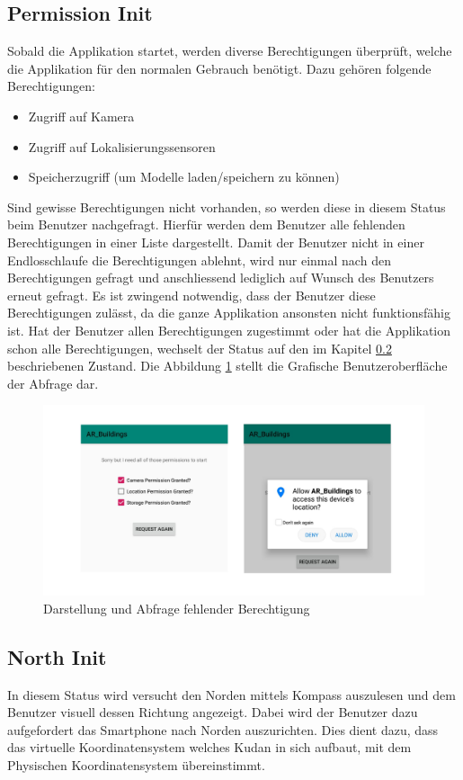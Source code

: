 \documentclass[a4paper]{scrreprt}
\begin{document}
\subsection{Permission Init}
Sobald die Applikation startet, werden diverse Berechtigungen überprüft, welche die Applikation für den normalen Gebrauch benötigt. Dazu gehören folgende Berechtigungen:
\begin{itemize}
\item Zugriff auf Kamera
\item Zugriff auf Lokalisierungssensoren
\item Speicherzugriff (um Modelle laden/speichern zu können)
\end{itemize}
Sind gewisse Berechtigungen nicht vorhanden, so werden diese in diesem Status beim Benutzer nachgefragt. Hierfür werden dem Benutzer alle fehlenden Berechtigungen in einer Liste dargestellt. Damit der Benutzer nicht in einer Endlosschlaufe die Berechtigungen ablehnt, wird nur einmal nach den Berechtigungen gefragt und anschliessend lediglich auf Wunsch des Benutzers erneut gefragt. Es ist zwingend notwendig, dass der Benutzer diese Berechtigungen zulässt, da die ganze Applikation ansonsten nicht funktionsfähig ist. Hat der Benutzer allen Berechtigungen zugestimmt oder hat die Applikation schon alle Berechtigungen, wechselt der Status auf den im Kapitel \ref{ch:NorthInit} beschriebenen Zustand. Die Abbildung \ref{fig:PermissionInitStatus} stellt die Grafische Benutzeroberfläche der Abfrage dar.
\begin{figure}[h!]
	\includegraphics[keepaspectratio, width=\textwidth]{ARBuildingPermissionRequest.png}
	\caption{Darstellung und Abfrage fehlender Berechtigung}
    \label{fig:PermissionInitStatus}
\end{figure}

\subsection{North Init} \label{ch:NorthInit}
In diesem Status wird versucht den Norden mittels Kompass auszulesen und dem Benutzer visuell dessen Richtung angezeigt. Dabei wird der Benutzer dazu aufgefordert das Smartphone nach Norden auszurichten. Dies dient dazu, dass das virtuelle Koordinatensystem welches Kudan in sich aufbaut, mit dem Physischen Koordinatensystem übereinstimmt.
\end{document}
